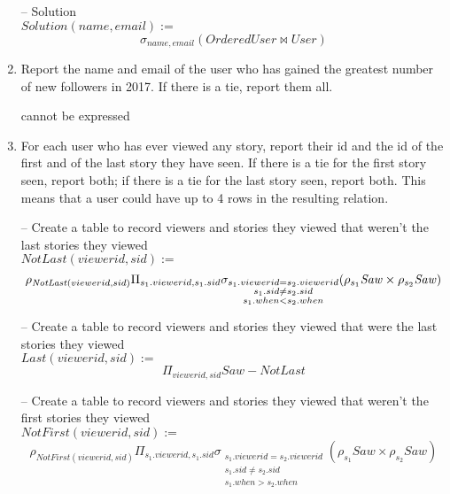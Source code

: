 \documentclass{article}
\newcommand{\var}[1]{\mathit{#1}}
\begin{document}
\begin{enumerate}
-- Solution \\
$\var{Solution}(name, email) := $
\[
    \sigma_{name, email} (\var{OrderedUser} \bowtie \var{User})
\]

\item   %
Report the name and email of the user
who has gained the greatest number of new followers in 2017. 
If there is a tie, report them all.

cannot be expressed

\item   %
For each user who has ever viewed any story, 
    report their id and the id of the first and of the last story they have seen.
If there is a tie for the first story seen, report both;
if there is a tie for the last story seen, report both.
This means that a user could have up to 4 rows in the resulting relation.


\large{
    
    -- Create a table to record viewers and stories they viewed that weren't the last stories they viewed \\
    $\var{NotLast}(viewerid,sid):=$
    \[
        \rho_{\var{NotLast}(viewerid,sid)}
        \Pi_{s_1.viewerid,s_1.sid} 
        \sigma_{
            \substack{
                s_1.viewerid = s_2.viewerid \\
                s_1.sid \ne s_2.sid \\
                s_1.when < s_2.when \\
            }
        }\\
        (\rho_{s_1} \var{Saw} \times \rho_{s_2} \var{Saw}) 
    \]
    
    -- Create a table to record viewers and stories they viewed that were the last stories they viewed \\
    $\var{Last}(viewerid,sid):=$
    \[
        \Pi_{viewerid,sid} \var{Saw} - NotLast
    \]
    
    -- Create a table to record viewers and stories they viewed that weren't the first stories they viewed \\
    $\var{NotFirst}(viewerid,sid):=$
    \[
        \rho_{\var{NotFirst}(viewerid,sid)}
        \Pi_{s_1.viewerid,s_1.sid} 
        \sigma_{
            \substack{
                s_1.viewerid = s_2.viewerid \\
                s_1.sid \ne s_2.sid \\
                s_1.when > s_2.when \\
            }
        } 
        (\rho_{s_1} \var{Saw} \times \rho_{s_2} \var{Saw}) 
    \]
    
}
\end{enumerate}
\end{document}
